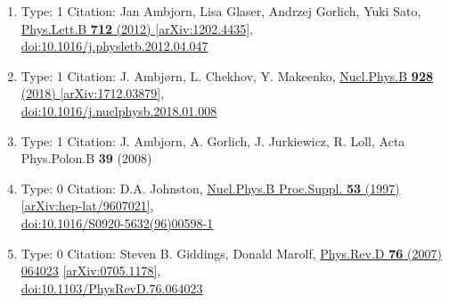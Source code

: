 \documentclass[a4paper,10pt]{article}
\begin{document}
\begin{enumerate}
\begin{enumerate}
  \item Type: 1 Citation: Jan Ambjorn, Lisa Glaser, Andrzej Gorlich, Yuki Sato, \href{https://www.doi.org/10.1016/j.physletb.2012.04.047}{Phys.Lett.B {\bf 712} (2012) }  \href{https://arxiv.org/abs/1202.4435}{[arXiv:1202.4435]},\\\href{https://www.doi.org/10.1016/j.physletb.2012.04.047}{doi:10.1016/j.physletb.2012.04.047}
  \item Type: 1 Citation: J. Ambjørn, L. Chekhov, Y. Makeenko, \href{https://www.doi.org/10.1016/j.nuclphysb.2018.01.008}{Nucl.Phys.B {\bf 928} (2018) }  \href{https://arxiv.org/abs/1712.03879}{[arXiv:1712.03879]},\\\href{https://www.doi.org/10.1016/j.nuclphysb.2018.01.008}{doi:10.1016/j.nuclphysb.2018.01.008}
  \item Type: 1 Citation: J. Ambjorn, A. Gorlich, J. Jurkiewicz, R. Loll, Acta Phys.Polon.B {\bf 39} (2008) 
  \item Type: 0 Citation: D.A. Johnston, \href{https://www.doi.org/10.1016/S0920-5632(96)00598-1}{Nucl.Phys.B Proc.Suppl. {\bf 53} (1997) }  \href{https://arxiv.org/abs/hep-lat/9607021}{[arXiv:hep-lat/9607021]},\\\href{https://www.doi.org/10.1016/S0920-5632(96)00598-1}{doi:10.1016/S0920-5632(96)00598-1}
  \item Type: 0 Citation: Steven B. Giddings, Donald Marolf, \href{https://www.doi.org/10.1103/PhysRevD.76.064023}{Phys.Rev.D {\bf 76} (2007) 064023}  \href{https://arxiv.org/abs/0705.1178}{[arXiv:0705.1178]},\\\href{https://www.doi.org/10.1103/PhysRevD.76.064023}{doi:10.1103/PhysRevD.76.064023}

\end{enumerate}
\end{enumerate}
\end{document}
